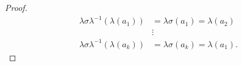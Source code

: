 \begin{proof}
    \begin{align*}
        \lambda \sigma \lambda^{-1}(\lambda(a_1))
        &= \lambda\sigma(a_1)
        = \lambda(a_2) \\
        &\vdots \\
        \lambda \sigma \lambda^{-1}(\lambda(a_k))
        &= \lambda\sigma(a_k)
        = \lambda(a_1).
    \end{align*}
\end{proof}
